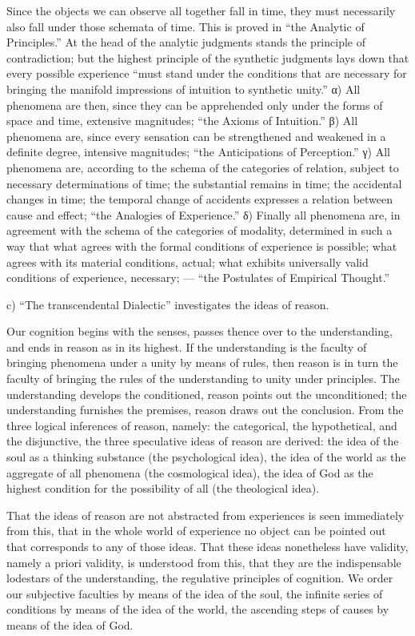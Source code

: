 \documentclass[12pt]{book}
\begin{document}
Since the objects we can observe all together fall in time, they must necessarily
also fall under those schemata of time. This is proved in ``the Analytic of
Principles.'' At the head of the analytic judgments stands the principle of
contradiction; but the highest principle of the synthetic judgments lays down that
every possible experience ``must stand under the conditions that are necessary for
bringing the manifold impressions of intuition to synthetic unity.'' α) All
phenomena are then, since they can be apprehended only under the forms of space
and time, extensive magnitudes; ``the Axioms of Intuition.'' β) All phenomena are,
since every sensation can be strengthened and weakened in a definite degree,
intensive magnitudes; ``the Anticipations of Perception.'' γ) All phenomena are,
according to the schema of the categories of relation, subject to necessary
determinations of time; the substantial remains in time; the accidental changes in
time; the temporal change of accidents expresses a relation between cause and
effect; ``the Analogies of Experience.'' δ) Finally all phenomena are, in
agreement with the schema of the categories of modality,
determined in such a way that what agrees with the formal conditions of experience
is possible; what agrees with its material conditions, actual; what exhibits
universally valid conditions of experience, necessary; --- ``the Postulates of
Empirical Thought.''

c) ``The transcendental Dialectic'' investigates the ideas of reason.

Our cognition begins with the senses, passes thence over to the understanding, and
ends in reason as in its highest. If the understanding is the faculty of bringing
phenomena under a unity by means of rules, then reason is in turn the faculty of
bringing the rules of the understanding to unity under principles. The
understanding develops the conditioned, reason points out the unconditioned; the
understanding furnishes the premises, reason draws out the conclusion. From the
three logical inferences of reason, namely: the categorical, the hypothetical, and
the disjunctive, the three speculative ideas of reason are derived: the idea of
the soul as a thinking substance (the psychological idea), the idea of the world
as the aggregate of all phenomena (the cosmological idea), the idea of God as the
highest condition for the possibility of all (the theological idea).

That the ideas of reason are not abstracted from experiences is seen immediately
from this, that in the whole world of experience no object can be pointed out that
corresponds to any of those ideas. That these ideas nonetheless have validity,
namely a priori validity, is understood from this, that they are the indispensable
lodestars of the understanding, the regulative principles of cognition. We order
our subjective faculties by means of the idea of the soul, the infinite series of
conditions by means of the idea of the world, the ascending steps of causes by
means of the idea of God.
\end{document}

